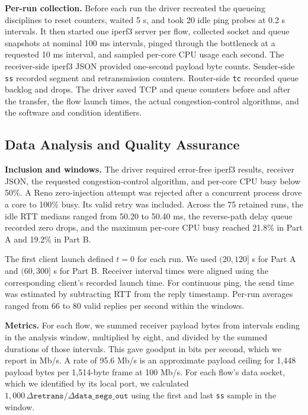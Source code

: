 \documentclass[11pt,a4paper]{article}
\begin{document}
\textbf{Per-run collection.} Before each run the driver recreated the queueing disciplines to reset counters, waited 5 s, and took 20 idle ping probes at 0.2 s intervals. It then started one iperf3 server per flow, collected socket and queue snapshots at nominal 100 ms intervals, pinged through the bottleneck at a requested 10 ms interval, and sampled per-core CPU usage each second. The receiver-side iperf3 JSON provided one-second payload byte counts. Sender-side \texttt{ss} recorded segment and retransmission counters. Router-side \texttt{tc} recorded queue backlog and drops. The driver saved TCP and queue counters before and after the transfer, the flow launch times, the actual congestion-control algorithms, and the software and condition identifiers.

\subsection{Data Analysis and Quality Assurance}

\textbf{Inclusion and windows.} The driver required error-free iperf3 results, receiver JSON, the requested congestion-control algorithm, and per-core CPU busy below 50\%. A Reno zero-injection attempt was rejected after a concurrent process drove a core to 100\% busy. Its valid retry was included. Across the 75 retained runs, the idle RTT medians ranged from 50.20 to 50.40 ms, the reverse-path delay queue recorded zero drops, and the maximum per-core CPU busy reached 21.8\% in Part A and 19.2\% in Part B.

The first client launch defined $t=0$ for each run. We used $(20,120]$ s for Part A and $(60,300]$ s for Part B. Receiver interval times were aligned using the corresponding client's recorded launch time. For continuous ping, the send time was estimated by subtracting RTT from the reply timestamp. Per-run averages ranged from 66 to 80 valid replies per second within the windows.

\textbf{Metrics.} For each flow, we summed receiver payload bytes from intervals ending in the analysis window, multiplied by eight, and divided by the summed durations of those intervals. This gave goodput in bits per second, which we report in Mb/s. A rate of 95.6 Mb/s is an approximate payload ceiling for 1,448 payload bytes per 1,514-byte frame at 100 Mb/s. For each flow's data socket, which we identified by its local port, we calculated $1{,}000\,\Delta\texttt{retrans}/\Delta\texttt{data\_segs\_out}$ using the first and last \texttt{ss} sample in the window.
\end{document}
